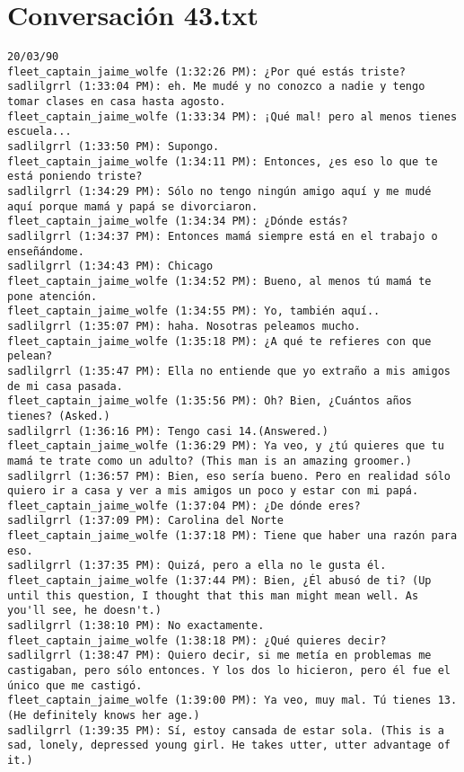 \section{Conversaci\'on 43.txt}

\begin{verbatim}
20/03/90
fleet_captain_jaime_wolfe (1:32:26 PM): ¿Por qué estás triste? 
sadlilgrrl (1:33:04 PM): eh. Me mudé y no conozco a nadie y tengo tomar clases en casa hasta agosto.
fleet_captain_jaime_wolfe (1:33:34 PM): ¡Qué mal! pero al menos tienes escuela...
sadlilgrrl (1:33:50 PM): Supongo.
fleet_captain_jaime_wolfe (1:34:11 PM): Entonces, ¿es eso lo que te está poniendo triste?
sadlilgrrl (1:34:29 PM): Sólo no tengo ningún amigo aquí y me mudé aquí porque mamá y papá se divorciaron.
fleet_captain_jaime_wolfe (1:34:34 PM): ¿Dónde estás?
sadlilgrrl (1:34:37 PM): Entonces mamá siempre está en el trabajo o enseñándome.
sadlilgrrl (1:34:43 PM): Chicago
fleet_captain_jaime_wolfe (1:34:52 PM): Bueno, al menos tú mamá te pone atención.
fleet_captain_jaime_wolfe (1:34:55 PM): Yo, también aquí..
sadlilgrrl (1:35:07 PM): haha. Nosotras peleamos mucho.
fleet_captain_jaime_wolfe (1:35:18 PM): ¿A qué te refieres con que pelean?
sadlilgrrl (1:35:47 PM): Ella no entiende que yo extraño a mis amigos de mi casa pasada.
fleet_captain_jaime_wolfe (1:35:56 PM): Oh? Bien, ¿Cuántos años tienes? (Asked.)
sadlilgrrl (1:36:16 PM): Tengo casi 14.(Answered.)
fleet_captain_jaime_wolfe (1:36:29 PM): Ya veo, y ¿tú quieres que tu mamá te trate como un adulto? (This man is an amazing groomer.)
sadlilgrrl (1:36:57 PM): Bien, eso sería bueno. Pero en realidad sólo quiero ir a casa y ver a mis amigos un poco y estar con mi papá.
fleet_captain_jaime_wolfe (1:37:04 PM): ¿De dónde eres?
sadlilgrrl (1:37:09 PM): Carolina del Norte
fleet_captain_jaime_wolfe (1:37:18 PM): Tiene que haber una razón para eso.
sadlilgrrl (1:37:35 PM): Quizá, pero a ella no le gusta él.
fleet_captain_jaime_wolfe (1:37:44 PM): Bien, ¿Él abusó de ti? (Up until this question, I thought that this man might mean well. As you'll see, he doesn't.)
sadlilgrrl (1:38:10 PM): No exactamente.
fleet_captain_jaime_wolfe (1:38:18 PM): ¿Qué quieres decir?
sadlilgrrl (1:38:47 PM): Quiero decir, si me metía en problemas me castigaban, pero sólo entonces. Y los dos lo hicieron, pero él fue el único que me castigó.
fleet_captain_jaime_wolfe (1:39:00 PM): Ya veo, muy mal. Tú tienes 13. (He definitely knows her age.)
sadlilgrrl (1:39:35 PM): Sí, estoy cansada de estar sola. (This is a sad, lonely, depressed young girl. He takes utter, utter advantage of it.)

\end{verbatim}
